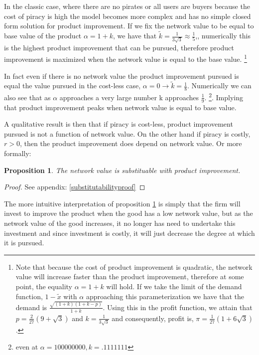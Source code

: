 \documentclass[11pt]{article}
\newtheorem{proposition}{Proposition}
\begin{document}
In the classic case, where there are no pirates or all users are buyers because the cost of piracy is high the model becomes more complex and has no simple closed form solution for product improvement. If we fix the network value to be equal to base value of the product $\alpha=1+k$, we have that $\tilde{k} = \frac{1}{3 \sqrt{3}} \approx \frac{1}{5}$,, numerically this is the highest product improvement that can be pursued, therefore product improvement is maximized when the network value is equal to the base value.   \footnote{Note that because the cost of product improvement is quadratic, the network value will increase faster than the product improvement, therefore at some point, the equality $\alpha = 1+k$ will hold. If we take the limit of the demand function, $1-\tilde{x}$ with $\alpha$ approaching this parameterization we have that the demand is $\frac{\sqrt{(1+k)(1+k-p)}}{1+k}$. Using this in the profit function, we attain that $p=\frac{2}{27} (9 + \sqrt{3})$ and $k=\frac{1}{3 \sqrt{3}} $ and consequently, profit is, $\pi = \frac{1}{27} \left(1+6 \sqrt{3}\right)$.}

In fact even if there is no network value the product improvement pursued is equal the value pursued in the cost-less case,  $\alpha=0 \rightarrow \tilde{k} = \frac{1}{8}$. Numerically we can also see that as $\alpha$ approaches a very large number k approaches $\frac{1}{9}$. 
\footnote{even at $\alpha=100 000 000, k=.1111111$  }. Implying that product improvement peaks when network value is equal to base value. 


A qualitative result is then that if piracy is cost-less, product improvement pursued is not a function of network value. On the other hand if piracy is costly, $r>0$, then the product improvement does depend on network value. Or more formally:


\begin{proposition}
\label{substitutabilityproposition}
The network value is substituable with product improvement. 
\end{proposition}

\begin{proof}
See appendix: \ref{substitutabilityproof}
\end{proof}

The more intuitive interpretation of proposition \ref{substitutabilityproposition} is simply that the firm will invest to improve the product when the good has a low network value, but as the network value of the good increases, it no longer has need to undertake this investment and since investment is costly, it will just decrease the degree at which it is pursued.
\end{document}

